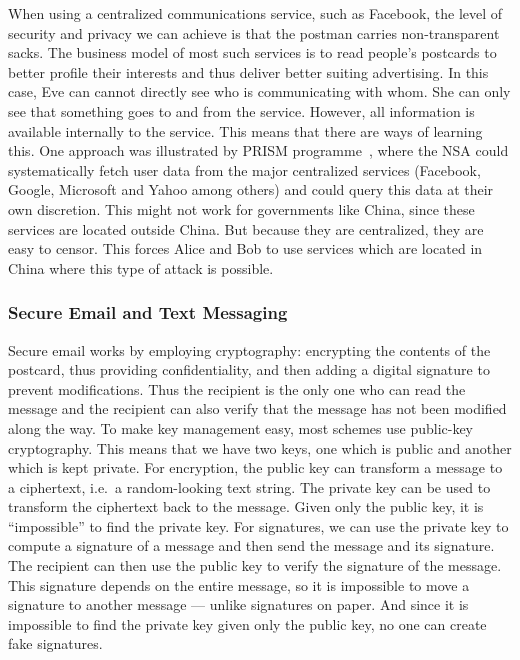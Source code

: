 When using a centralized communications service, such as Facebook, the
level of security and privacy we can achieve is that the postman
carries non-transparent sacks.  The business model of most such
services is to read people's postcards to better profile their
interests and thus deliver better suiting advertising.
In this case, Eve can cannot directly see who is communicating with whom.
She can only see that something goes to and from the service.
However, all information is available
internally to the service.  This means that there are ways of learning
this.
One approach was illustrated by  PRISM programme~\cite{Prism}, where 
the \ac{NSA} could systematically fetch user data from the major centralized 
services (Facebook, Google, Microsoft and Yahoo among others) and could query 
this data at their own discretion.
This might not work for governments like China, since these services are 
located outside China.
But because they are centralized, they are easy to censor.
This forces Alice and Bob to use services which are located in China where this 
type of attack is possible.

\subsubsection{Secure Email and Text Messaging}

Secure email works by employing cryptography:  encrypting the contents of the 
postcard, thus providing confidentiality, and then adding a digital signature to 
prevent modifications.
Thus the recipient is the only one who can read the message and the recipient 
can also verify that the message has not been modified along the way.
To make key management easy, most schemes use public-key cryptography.
This means that we have two keys, one which is public and another which is kept
private.
For encryption, the public key can transform a message to a ciphertext, i.e.\ 
a random-looking text string.
The private key can be used to transform the ciphertext back to the message.
Given only the public key, it is \enquote{impossible} to find the private key.
For signatures, we can use the private key to compute a signature of a message 
and then send the message and its signature.
The recipient can then use the public key to verify the signature of the 
message.
This signature depends on the entire message, so it is impossible to move 
a signature to another message --- unlike signatures on paper.
And since it is impossible to find the private key given only the public key, 
no one can create fake signatures.

